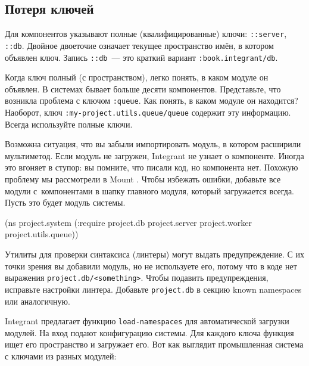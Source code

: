 \fi

\subsection{Потеря ключей}


Для компонентов указывают полные (квалифицированные) ключи: \verb|::server|,
\verb|::db|. Двойное двоеточие означает текущее пространство имён, в котором
объявлен ключ. Запись \verb|::db|~--- это краткий вариант
\verb|:book.integrant/db|.

Когда ключ полный (с пространством), легко понять, в каком модуле он объявлен. В
системах бывает больше десяти компонентов. Представьте, что возникла проблема с
ключом \verb|:queue|. Как понять, в каком модуле он находится?  Наоборот, ключ
\texttt{:my-project.utils.queue\-/queue} содержит эту информацию. Всегда используйте
полные ключи.

Возможна ситуация, что вы забыли импортировать модуль, в котором расширили
мультиметод. Если модуль не загружен, Integrant не узнает о компоненте. Иногда
это вгоняет в ступор: вы помните, что писали код, но компонента нет. Похожую
проблему мы рассмотрели в Mount . Чтобы избежать ошибки,
добавьте все модули с~компонентами в шапку главного модуля, который загружается
всегда. Пусть это будет модуль системы.

\begin{english}
  \begin{clojure}
(ns project.system
  (:require project.db
            project.server
            project.worker
            project.utils.queue))
  \end{clojure}
\end{english}

Утилиты для проверки синтаксиса (линтеры) могут выдать предупреждение. С их
точки зрения вы добавили модуль, но не используете его, потому что в коде нет
выражения \verb|project.db/<something>|. Чтобы подавить предупреждения,
исправьте настройки линтера. Добавьте \verb|project.db| в секцию known
namespaces или аналогичную.


\mnoindent
Integrant предлагает функцию \verb|load-namespaces| для автоматической загрузки
модулей. На вход подают конфигурацию системы. Для каждого ключа функция ищет его
пространство и загружает его. Вот как выглядит промышленная система с ключами из
разных модулей:

